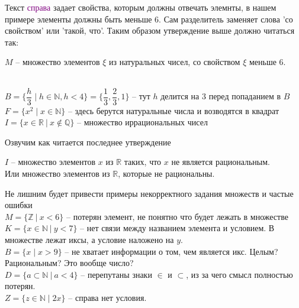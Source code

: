 Текст \textcolor{Purple}{справа} задает свойства, которым должны отвечать элемнты, в нашем примере элементы должны быть меньше 6. Сам \textcolor{BrickRed}{разделитель} заменяет слова 'со свойством' или 'такой, что'. Таким образом утверждение выше должно читаться так:
\begin{center}
$M$ -- множество элементов $\xi$ из натуральных чисел, со свойством $\xi$ меньше 6.
\end{center}
\begin{example}
\ \\
$B = \{\dfrac{h}{3}\mid h\in\mathbb{N},h<4\}=\{\dfrac{1}{3},\dfrac{2}{3},1\}$ -- тут $h$ делится на 3 перед попаданием в $B$\\[2pt]
$F=\{x^2\mid x \in \mathbb{N}\}$ -- здесь берутся натуральные числа и возводятся в квадрат\\
$I=\{x\in \mathbb{R}\ |\ x \notin \mathbb{Q}\}$ -- множество иррациональных чисел

Озвучим как читается последнее утверждение
\begin{center}
$I$ -- множество элементов $x$ из $\mathbb{R}$ таких, что $x$ не является рациональным.\\
Или множество элементов из $\mathbb{R}$, которые не рациональны.
\end{center}

Не лишним будет привести примеры некорректного задания множеств и частые ошибки\\
$M=\{\mathbb{Z}\ |\ x<6\}$ -- потерян элемент, не понятно что будет лежать в множестве\\
$K=\{x \in \mathbb{N}\ |\ y<7\}$ -- нет связи между названием элемента и условием. В множестве лежат иксы, а условие наложено на $y$.\\
$B=\{x\mid x>9\}$ -- не хватает информации о том, чем является икс. Целым? Рациональным? Это вообще число?\\
$D=\{a \subset \mathbb{N}\ |\ a<4\}$ -- перепутаны знаки $\in$ и $\subset$, из за чего смысл полностью потерян.\\
$Z=\{z\in\mathbb{N}\mid 2x\}$ -- справа нет условия.
\end{example}
